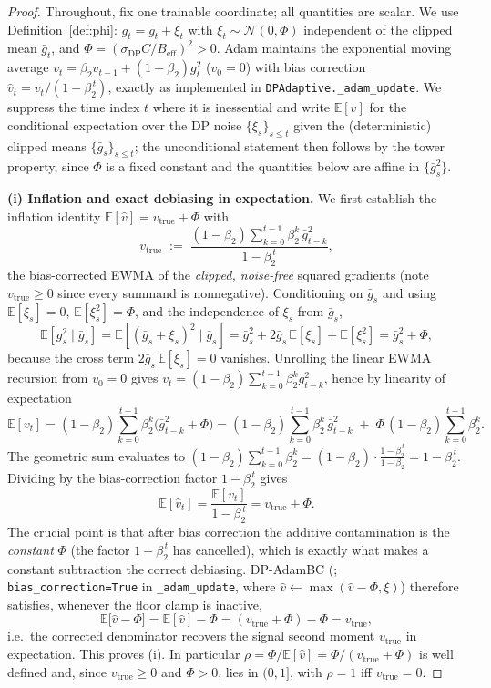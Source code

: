 \begin{proof}
Throughout, fix one trainable coordinate; all quantities are scalar. We use Definition~\ref{def:phi}: $g_t=\bar g_t+\xi_t$ with $\xi_t\sim\mathcal N(0,\Phi)$ independent of the clipped mean $\bar g_t$, and $\Phi=(\sigma_{\mathrm{DP}}C/B_{\mathrm{eff}})^2>0$. Adam maintains the exponential moving average $v_t=\beta_2 v_{t-1}+(1-\beta_2)g_t^2$ ($v_0=0$) with bias correction $\hat v_t=v_t/(1-\beta_2^{\,t})$, exactly as implemented in \texttt{DPAdaptive.\_adam\_update}. We suppress the time index $t$ where it is inessential and write $\mathbb E[\hat v]$ for the conditional expectation over the DP noise $\{\xi_s\}_{s\le t}$ given the (deterministic) clipped means $\{\bar g_s\}_{s\le t}$; the unconditional statement then follows by the tower property, since $\Phi$ is a fixed constant and the quantities below are affine in $\{\bar g_s^2\}$.

\medskip
\noindent\textbf{(i) Inflation and exact debiasing in expectation.}
We first establish the inflation identity $\mathbb E[\hat v]=v_{\mathrm{true}}+\Phi$ with
\[
v_{\mathrm{true}}\;:=\;\frac{(1-\beta_2)\sum_{k=0}^{t-1}\beta_2^{k}\,\bar g_{t-k}^2}{1-\beta_2^{\,t}} ,
\]
the bias-corrected EWMA of the \emph{clipped, noise-free} squared gradients (note $v_{\mathrm{true}}\ge0$ since every summand is nonnegative). Conditioning on $\bar g_s$ and using $\mathbb E[\xi_s]=0$, $\mathbb E[\xi_s^2]=\Phi$, and the independence of $\xi_s$ from $\bar g_s$,
\[
\mathbb E\!\left[g_s^2\mid \bar g_s\right]
=\mathbb E\!\left[(\bar g_s+\xi_s)^2\mid \bar g_s\right]
=\bar g_s^2 + 2\bar g_s\,\mathbb E[\xi_s] + \mathbb E[\xi_s^2]
=\bar g_s^2+\Phi,
\]
because the cross term $2\bar g_s\,\mathbb E[\xi_s]=0$ vanishes. Unrolling the linear EWMA recursion from $v_0=0$ gives $v_t=(1-\beta_2)\sum_{k=0}^{t-1}\beta_2^{k}g_{t-k}^2$, hence by linearity of expectation
\[
\mathbb E[v_t]
=(1-\beta_2)\sum_{k=0}^{t-1}\beta_2^{k}\big(\bar g_{t-k}^2+\Phi\big)
=(1-\beta_2)\sum_{k=0}^{t-1}\beta_2^{k}\,\bar g_{t-k}^2 \;+\;\Phi\,(1-\beta_2)\sum_{k=0}^{t-1}\beta_2^{k}.
\]
The geometric sum evaluates to $(1-\beta_2)\sum_{k=0}^{t-1}\beta_2^{k}=(1-\beta_2)\cdot\frac{1-\beta_2^{\,t}}{1-\beta_2}=1-\beta_2^{\,t}$. Dividing by the bias-correction factor $1-\beta_2^{\,t}$ gives
\[
\mathbb E[\hat v_t]=\frac{\mathbb E[v_t]}{1-\beta_2^{\,t}}
= v_{\mathrm{true}} + \Phi .
\]
The crucial point is that after bias correction the additive contamination is the \emph{constant} $\Phi$ (the factor $1-\beta_2^{\,t}$ has cancelled), which is exactly what makes a constant subtraction the correct debiasing. DP-AdamBC (\citealp{tang2024dpadambc}; \texttt{bias\_correction=True} in \texttt{\_adam\_update}, where $\hat v\leftarrow\max(\hat v-\Phi,\xi)$) therefore satisfies, whenever the floor clamp is inactive,
\[
\mathbb E\big[\hat v - \Phi\big]=\mathbb E[\hat v]-\Phi=(v_{\mathrm{true}}+\Phi)-\Phi=v_{\mathrm{true}},
\]
i.e.\ the corrected denominator recovers the signal second moment $v_{\mathrm{true}}$ in expectation. This proves (i). In particular $\rho=\Phi/\mathbb E[\hat v]=\Phi/(v_{\mathrm{true}}+\Phi)$ is well defined and, since $v_{\mathrm{true}}\ge 0$ and $\Phi>0$, lies in $(0,1]$, with $\rho=1$ iff $v_{\mathrm{true}}=0$.


\end{proof}
